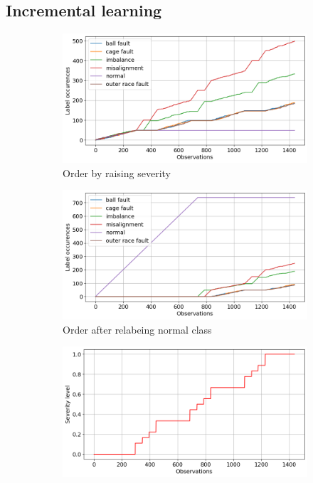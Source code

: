 \clearpage

\subsection{Incremental learning}
\begin{figure}[ht]
    \centering
    \begin{subfigure}[b]{0.3\textwidth}
        \includegraphics[width=\textwidth]{assets/results/incremental-learning/order-natural.png}
        \caption{Order by raising severity}
    \end{subfigure}
    \hfill
    \begin{subfigure}[b]{0.3\textwidth}
        \includegraphics[width=\textwidth]{assets/results/incremental-learning/order-severity.png}
        \caption{Order after relabeing normal class}
    \end{subfigure}
    \hfill
    \begin{subfigure}[b]{0.3\textwidth}
        \includegraphics[width=\textwidth]{assets/results/incremental-learning/severity-levels.png}

\end{subfigure}
\end{figure}

